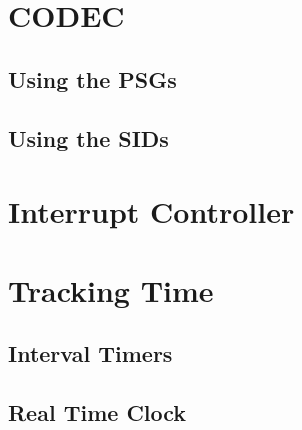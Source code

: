 \documentclass[oneside]{book}
\begin{document}
\chapter{CODEC}

\section{Using the PSGs}

\section{Using the SIDs}

\chapter{Interrupt Controller}

\chapter{Tracking Time}

\section{Interval Timers}

\section{Real Time Clock}




\end{document}
